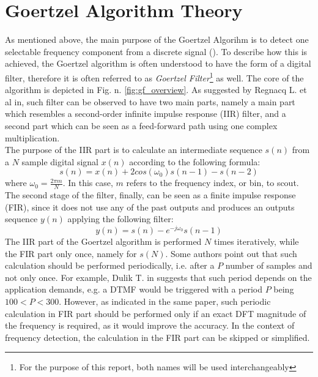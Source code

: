 \section{Goertzel Algorithm Theory}\label{sec:theory}
As mentioned above, the main purpose of the Goertzel Algorihm is to detect one selectable frequency component from a discrete signal (\cite{Chen1998ModifiedGA}). To describe how this is achieved, the Goertzel algorithm is often understood to have the form of a digital filter, therefore it is often referred to as \textit{Goertzel Filter}\footnote{For the purpose of this report, both names will be used interchangeably} as well. The core of the algorithm is depicted in Fig. n. \ref{fig:gf_overview}. As suggested by Regnacq L. et al in\cite{9464344}, such filter can be observed to have two main parts, namely a main part which resembles a second-order infinite impulse response (IIR) filter, and a second part which can be seen as a feed-forward path using one complex multiplication.\\
The purpose of the IIR part is to calculate an intermediate sequence $s(n)$ from a $N$ sample digital signal $x(n)$ according to the following formula:
\begin{equation}
    s(n) = x(n) + 2cos(\omega_0)s(n-1) - s(n-2)
    \label{eq:UPDATE}
\end{equation}
where $\omega_0 = \frac{2\pi m}{N}$. In this case, $m$ refers to the frequency index, or bin, to scout.\\
The second stage of the filter, finally, can be seen as a finite impulse response (FIR), since it does not use any of the past outputs and produces an outputs sequence $y(n)$ applying the following filter:
\begin{equation} \label{eq:FIR}
    y(n) = s(n) - e^{-j\omega_0}s(n-1)
\end{equation}
The IIR part of the Goertzel algorithm is performed $N$ times iteratively, while the FIR part only once, namely for $s(N)$. Some authors point out that such calculation should be performed periodically, i.e. after a $P$ number of samples and not only once. For example, Dulik T. in \cite{dulik} suggests that such period depends on the application demands, e.g. a DTMF would be triggered with a period $P$ being $100<P<300$. However, as indicated in the same paper, such periodic calculation in FIR part should be performed only if an exact DFT magnitude of the frequency is required, as it would improve the accuracy. In the context of frequency detection, the calculation in the FIR part can be skipped or simplified.  \\
